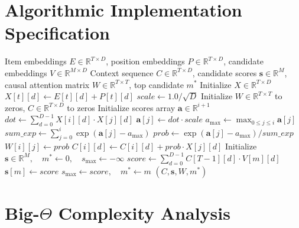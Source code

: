 \documentclass[11pt,a4paper]{article}
\theoremstyle{definition}
\begin{document}
\section{Algorithmic Implementation Specification}

\begin{algorithm}[H]
\caption{SASRec Causal Self-Attention and Candidate Item Scoring}
\begin{algorithmic}[1]
\Require Item embeddings $E \in \mathbb{R}^{T \times D}$, position embeddings $P \in \mathbb{R}^{T \times D}$, candidate embeddings $V \in \mathbb{R}^{M \times D}$
\Ensure Context sequence $C \in \mathbb{R}^{T \times D}$, candidate scores $\mathbf{s} \in \mathbb{R}^M$, causal attention matrix $W \in \mathbb{R}^{T \times T}$, top candidate $m^*$
\State Initialize $X \in \mathbb{R}^{T \times D}$
 
        \State $X[t][d] \gets E[t][d] + P[t][d]$
    \EndFor
\EndFor
\State $scale \gets 1.0 / \sqrt{D}$
\State Initialize $W \in \mathbb{R}^{T \times T}$ to zeros, $C \in \mathbb{R}^{T \times D}$ to zeros
 
    \State Initialize scores array $\mathbf{a} \in \mathbb{R}^{i+1}$
        \State $dot \gets \sum_{d=0}^{D-1} X[i][d] \cdot X[j][d]$
        \State $\mathbf{a}[j] \gets dot \cdot scale$
    \EndFor
    \State $a_{\max} \gets \max_{0 \le j \le i} \mathbf{a}[j]$
    \State $sum\_exp \gets \sum_{j=0}^i \exp(\mathbf{a}[j] - a_{\max})$
        \State $prob \gets \exp(\mathbf{a}[j] - a_{\max}) / sum\_exp$
        \State $W[i][j] \gets prob$
            \State $C[i][d] \gets C[i][d] + prob \cdot X[j][d]$
        \EndFor
    \EndFor
\EndFor
\State Initialize $\mathbf{s} \in \mathbb{R}^M, \quad m^* \gets 0, \quad s_{\max} \gets -\infty$
 
    \State $score \gets \sum_{d=0}^{D-1} C[T-1][d] \cdot V[m][d]$
    \State $\mathbf{s}[m] \gets score$
        \State $s_{\max} \gets score, \quad m^* \gets m$
    \EndIf
\EndFor
\State \Return $(C, \mathbf{s}, W, m^*)$
\end{algorithmic}
\end{algorithm}

\section{Big-$\Theta$ Complexity Analysis}
\end{document}
